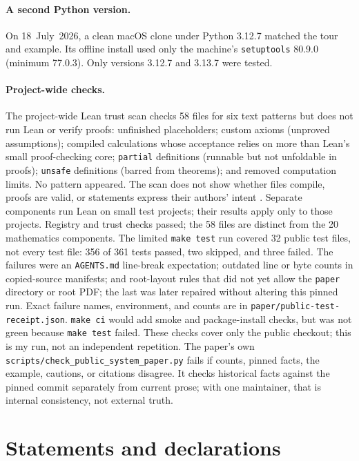 \documentclass[11pt]{article}
\newcommand{\code}[1]{\texttt{#1}}
\newcommand{\component}[1]{\nolinkurl{#1}}
\newcommand{\mathcount}{20}
\newcommand{\leanfilecount}{58}
\begin{document}
\paragraph{A second Python version.} On 18~July~2026, a clean macOS clone under
Python 3.12.7 matched the tour and example. Its offline install used only the
machine's \code{setuptools} 80.9.0 (minimum 77.0.3). Only versions 3.12.7 and
3.13.7 were tested.

\paragraph{Project-wide checks.} The project-wide Lean trust scan checks
\leanfilecount{} files for six text patterns but does not run Lean or verify
proofs: unfinished placeholders; custom axioms
(unproved assumptions); compiled calculations whose acceptance
relies on more than Lean's small proof-checking core;
\code{partial} definitions (runnable but not unfoldable in proofs);
\code{unsafe} definitions (barred from theorems); and removed computation
limits. No pattern appeared. The scan does not show whether files compile,
proofs are valid, or statements express their authors' intent
\cite{leanvalidation}.
Separate components run Lean on small test projects; their results apply only
to those projects.
Registry and trust checks passed; the \leanfilecount{} files are distinct from
the \mathcount{} mathematics components.
The limited \code{make test} run covered 32 public test files, not every test
file: 356 of 361 tests passed, two skipped, and three failed. The
failures were an \code{AGENTS.md} line-break expectation; outdated line or byte
counts in copied-source manifests; and root-layout rules that did not yet allow
the \code{paper} directory or root PDF; the last was later repaired without
altering this pinned run. Exact failure names, environment, and counts are in
\component{paper/public-test-receipt.json}. \code{make ci} would add smoke and
package-install checks, but was not green because \code{make test} failed. These
checks cover only the public checkout; this is my run, not an independent
repetition.
The paper's own
\component{scripts/check_public_system_paper.py} fails if counts, pinned facts,
the example, cautions, or citations disagree. It checks historical facts against
the pinned commit separately from current prose; with one maintainer, that is
internal consistency, not external truth.

\section*{Statements and declarations}
\end{document}
